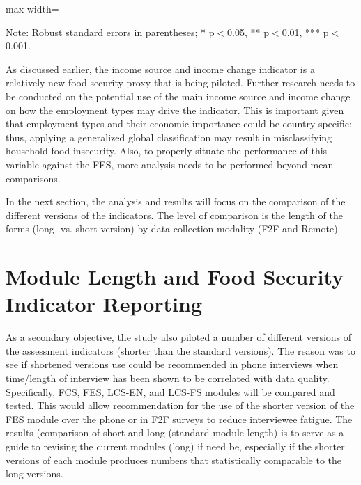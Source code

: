\documentclass[11pt,harvard]{article}
\begin{document}
	\begin{table}[htbp]
		\centering
		\begin{adjustbox}{max width=\textwidth}
			\begin{threeparttable}
				\caption{Impact of Survey Modality on Income}
				\scriptsize
				 
				\label{tab:INC_Modality_All_Country}
				\begin{tablenotes}
					\item Note: Robust standard errors in parentheses; * p$<$0.05, ** p$<$0.01, *** p$<$0.001. 
				\end{tablenotes}
			\end{threeparttable}
		\end{adjustbox}
	\end{table}
	
As discussed earlier, the income source and income change indicator is a relatively new food security proxy that is being piloted. Further research needs to be conducted on the potential use of the main income source and income change on how the employment types  may drive the indicator. This is important given that employment types and their economic importance could be country-specific; thus, applying a generalized global classification may result in misclassifying household food insecurity. Also, to properly situate the performance of this variable against the FES, more analysis needs to be performed beyond mean comparisons.

In the next section, the analysis and results will focus on the comparison of the different versions of the indicators. The level of comparison is the length of the forms (long- vs. short version) by data collection modality (F2F and Remote).
	
\pagebreak
	
\section{Module Length and Food Security Indicator Reporting}
	
As a secondary objective, the study also piloted a number of different versions of the assessment indicators (shorter than the standard versions). The reason was to see if shortened versions use could be recommended in phone interviews when time/length of interview has been shown to be correlated with data quality. Specifically, FCS, FES, LCS-EN, and LCS-FS modules will be compared and tested. This would allow recommendation for the use of the shorter version of the FES module over the phone or in F2F surveys to reduce interviewee fatigue. The results (comparison of short and long (standard module length) is to serve as a guide to revising the current modules (long) if need be, especially if the shorter versions of each module produces numbers that statistically comparable to the long versions.
	
\end{document}
